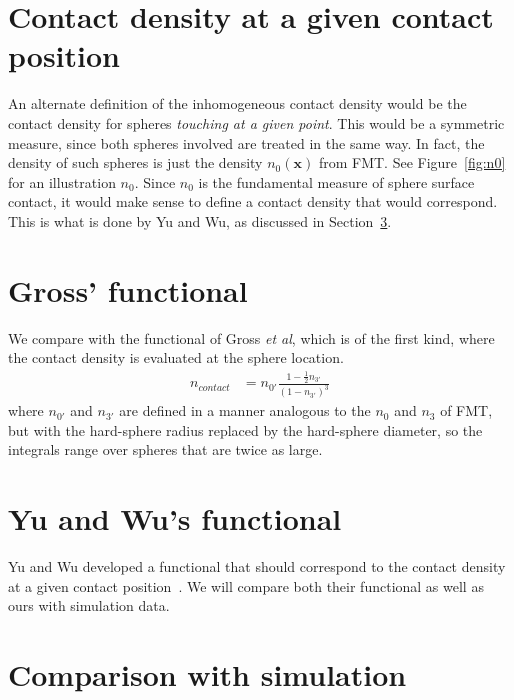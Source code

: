\documentclass[letterpaper,twocolumn,amsmath,amssymb,prb]{revtex4-1}
\newcommand{\xx}{\textbf{x}}
\begin{document}
\section{Contact density at a given contact position}

An alternate definition of the inhomogeneous contact density would be
the contact density for spheres \emph{touching at a given point}.
This would be a symmetric measure, since both spheres involved are
treated in the same way.  In fact, the density of such spheres is just
the density $n_0(\xx)$ from FMT.  See Figure~\ref{fig:n0} for an
illustration $n_0$.  Since $n_0$ is the fundamental measure of sphere
surface contact, it would make sense to define a contact density that
would correspond.  This is what is done by Yu and
Wu\cite{yu2002fmt-dft-inhomogeneous-associating}, as discussed in
Section~\ref{sec:yuwu}.

\section{Gross' functional}\label{sec:gross}
We compare with the functional of Gross \emph{et
  al}\cite{gross2009density}, which is of the first kind, where the
contact density is evaluated at the sphere location.
\begin{align}
  n_\textit{contact} &= n_{0'} \frac{1 - \frac12 n_{3'}}{\left(1 - n_{3'}\right)^3}
\end{align}
where $n_{0'}$ and $n_{3'}$ are defined in a manner analogous to the
$n_0$ and $n_3$ of FMT, but with the hard-sphere radius replaced by
the hard-sphere diameter, so the integrals range over spheres that are
twice as large.

\section{Yu and Wu's functional}\label{sec:yuwu}

Yu and Wu developed a functional that should correspond to the contact
density at a given contact
position~\cite{yu2002fmt-dft-inhomogeneous-associating}.  We will
compare both their functional as well as ours with simulation data.


\section{Comparison with simulation}
\end{document}
